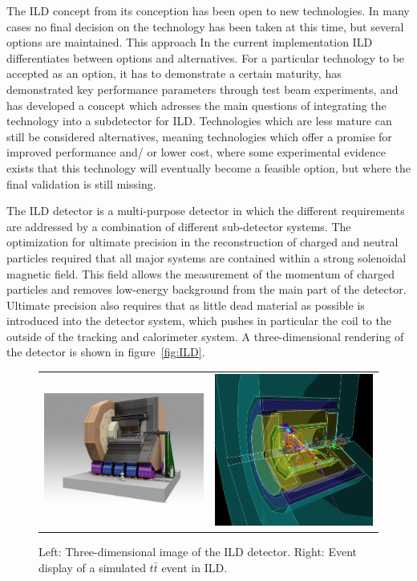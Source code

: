 \documentclass[%
 amsmath,amssymb,
 aps,
]{revtex4-1}
\begin{document}
The ILD concept from its conception has been open to new technologies. 
In many cases no final decision on the technology has been taken at this time, but several options are maintained. 
This approach In the current implementation ILD differentiates between options and alternatives. 
For a particular technology to be accepted as an option, it has to demonstrate a certain maturity, has demonstrated key performance parameters through test beam experiments, and has developed a concept which adresses the main questions of integrating the technology into a subdetector for ILD. Technologies which are less mature can still be considered alternatives, meaning technologies which offer a promise for improved performance and/ or lower cost, where some experimental evidence exists that this technology will eventually become a feasible option, but where the final validation is still missing. 

The ILD detector is a multi-purpose detector in which the different requirements are addressed by a combination of different sub-detector systems. The optimization for ultimate precision in the reconstruction of charged and neutral particles required that all major systems are contained within a strong solenoidal magnetic field. This field allows the measurement of the momentum of charged particles and removes low-energy background from the main part of the detector. Ultimate precision also requires that as little dead material as possible is introduced into the detector system, which pushes in particular the coil to the outside of the tracking and calorimeter system. A three-dimensional rendering of the detector is shown in figure~\ref{fig:ILD}.
\begin{figure}[tb]
 \begin{center}
 \begin{tabular}{lr}
 \includegraphics[width=0.48\hsize,clip]{figures/ILD_all_110826.jpg} & 
 \includegraphics[width=0.35\hsize]{figures/tt_500GeV_3D.png}
 \\
 \end{tabular}
\caption{Left: Three-dimensional image of the ILD detector. Right: Event display of a simulated $t \bar t$ event in ILD.
\label{fig_ild}}
 \end{center}
 \end{figure}
\end{document}
